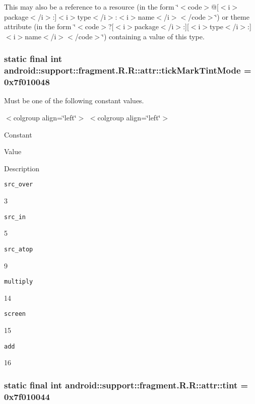 This may also be a reference to a resource (in the form \char`\"{}$<$code$>$@\mbox{[}$<$i$>$package$<$/i$>$:\mbox{]}$<$i$>$type$<$/i$>$:$<$i$>$name$<$/i$>$$<$/code$>$\char`\"{}) or theme attribute (in the form \char`\"{}$<$code$>$?\mbox{[}$<$i$>$package$<$/i$>$:\mbox{]}\mbox{[}$<$i$>$type$<$/i$>$:\mbox{]}$<$i$>$name$<$/i$>$$<$/code$>$\char`\"{}) containing a value of this type. \hypertarget{classandroid_1_1support_1_1fragment_1_1_r_1_1attr_0417e5a71e1b216da17a819ba411bdae}{
\subsubsection[{tickMarkTintMode}]{\setlength{\rightskip}{0pt plus 5cm}static final int android::support::fragment.R.R::attr::tickMarkTintMode = 0x7f010048}}
\label{classandroid_1_1support_1_1fragment_1_1_r_1_1attr_0417e5a71e1b216da17a819ba411bdae}


Must be one of the following constant values. \begin{TabularC}{0}
\hline
\end{TabularC}
$<$colgroup align=\char`\"{}left\char`\"{}$>$ $<$colgroup align=\char`\"{}left\char`\"{}$>$ 

Constant

Value

Description 

{\tt src\_\-over}

3

{\tt src\_\-in}

5

{\tt src\_\-atop}

9

{\tt multiply}

14

{\tt screen}

15

{\tt add}

16\hypertarget{classandroid_1_1support_1_1fragment_1_1_r_1_1attr_cdfc05ebdb3d08c2ddb0a51b7fa14488}{
\subsubsection[{tint}]{\setlength{\rightskip}{0pt plus 5cm}static final int android::support::fragment.R.R::attr::tint = 0x7f010044}}
\label{classandroid_1_1support_1_1fragment_1_1_r_1_1attr_cdfc05ebdb3d08c2ddb0a51b7fa14488}


